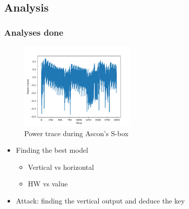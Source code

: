 \documentclass{beamer}
\begin{document}
	\subsection{Analysis}
	\begin{frame}
		\frametitle{Analyses done}
		\begin{figure}
			\centering
			\includegraphics[width=0.5\textwidth]{img_files/trace_ascon}
			\caption{Power trace during Ascon's S-box}
		\end{figure}
		\begin{itemize}
			\item{Finding the best model}
				\begin{itemize}
					\item{Vertical vs horizontal}
					\item{HW vs value}
				\end{itemize}
			\item{Attack: finding the vertical output and deduce the key}
		\end{itemize}
	\end{frame}
	
	
\end{document}
